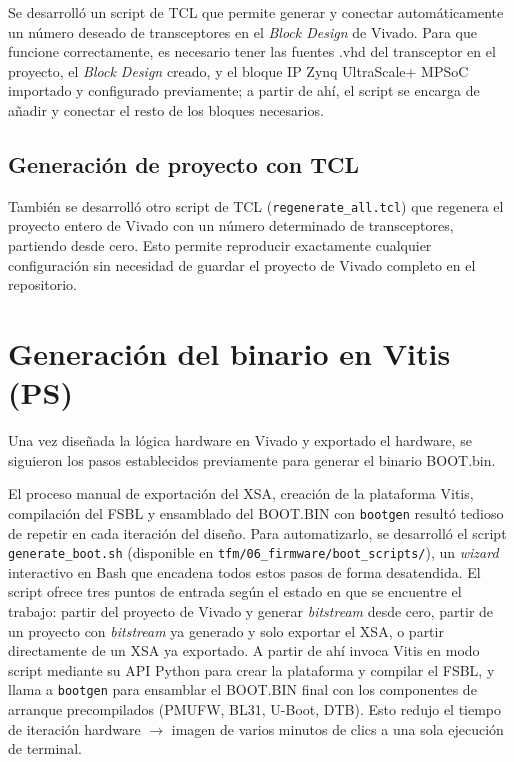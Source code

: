 Se desarrolló un script de TCL que permite generar y conectar automáticamente un número
deseado de transceptores en el \textit{Block Design} de Vivado. Para que funcione correctamente, es
necesario tener las fuentes .vhd del transceptor en el proyecto, el \textit{Block Design} creado, y el
bloque IP Zynq UltraScale+ MPSoC importado y configurado previamente; a partir de ahí, el
script se encarga de añadir y conectar el resto de los bloques necesarios.

\subsection{Generación de proyecto con TCL}

También se desarrolló otro script de TCL (\texttt{regenerate\_all.tcl}) que regenera el proyecto
entero de Vivado con un número determinado de transceptores, partiendo desde cero. Esto
permite reproducir exactamente cualquier configuración sin necesidad de guardar el proyecto
de Vivado completo en el repositorio.

\section{Generación del binario en Vitis (PS)}

Una vez diseñada la lógica hardware en Vivado y exportado el hardware, se siguieron los
pasos establecidos previamente para generar el binario BOOT.bin.

El proceso manual de exportación del XSA, creación de la plataforma Vitis, compilación del
FSBL y ensamblado del BOOT.BIN con \texttt{bootgen} resultó tedioso de repetir en cada
iteración del diseño. Para automatizarlo, se desarrolló el script \texttt{generate\_boot.sh}
(disponible en \texttt{tfm/06\_firmware/boot\_scripts/}), un \textit{wizard} interactivo en Bash que encadena todos
estos pasos de forma desatendida. El script ofrece tres puntos de entrada según el estado en
que se encuentre el trabajo: partir del proyecto de Vivado y generar \textit{bitstream} desde cero,
partir de un proyecto con \textit{bitstream} ya generado y solo exportar el XSA, o partir
directamente de un XSA ya exportado. A partir de ahí invoca Vitis en modo script mediante
su API Python para crear la plataforma y compilar el FSBL, y llama a \texttt{bootgen} para
ensamblar el BOOT.BIN final con los componentes de arranque precompilados (PMUFW,
BL31, U-Boot, DTB). Esto redujo el tiempo de iteración hardware $\rightarrow$ imagen de varios
minutos de clics a una sola ejecución de terminal.

